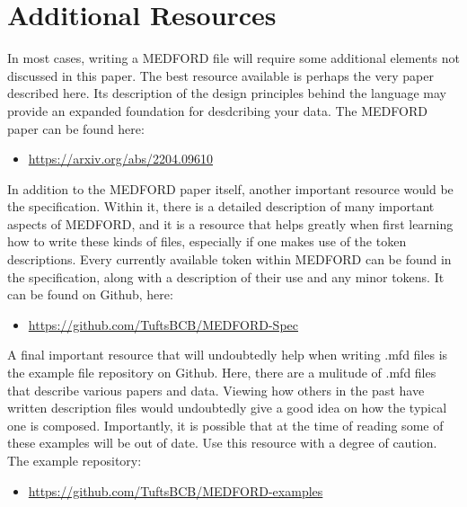 \documentclass[]{article}%
\begin{document}
\section{Additional Resources}


In most cases, writing a MEDFORD file will require some additional elements not discussed in this paper. The best resource available is perhaps the very paper described here. Its description of the design principles behind the language may provide an expanded foundation for desdcribing your data. The MEDFORD paper can be found here:

\begin{itemize}
    \item \href{https://arxiv.org/abs/2204.09610}{https://arxiv.org/abs/2204.09610}
\end{itemize}

In addition to the MEDFORD paper itself, another important resource would be the specification. Within it, there is a detailed description of many important aspects of MEDFORD, and it is a resource that helps greatly when first learning how to write these kinds of files, especially if one makes use of the token descriptions. Every currently available token within MEDFORD can be found in the specification, along with a description of their use and any minor tokens. It can be found on Github, here:

\begin{itemize}
    \item \href{https://github.com/TuftsBCB/MEDFORD-Spec/blob/master/main.pdf}{https://github.com/TuftsBCB/MEDFORD-Spec}
\end{itemize}

A final important resource that will undoubtedly help when writing .mfd files is the example file repository on Github. Here, there are a mulitude of .mfd files that describe various papers and data. Viewing how others in the past have written description files would undoubtedly give a good idea on how the typical one is composed. Importantly, it is possible that at the time of reading some of these examples will be out of date. Use this resource with a degree of caution. The example repository:

\begin{itemize}
    \item \href{https://github.com/TuftsBCB/MEDFORD-examples}{https://github.com/TuftsBCB/MEDFORD-examples}
\end{itemize}
\end{document}
